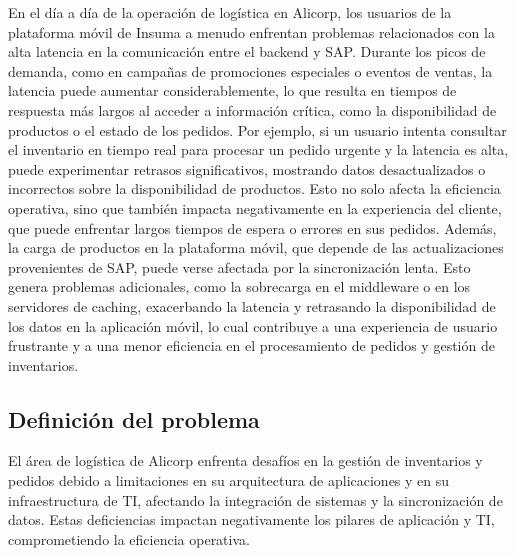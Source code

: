 En el día a día de la operación de logística en Alicorp, los usuarios de la plataforma móvil de Insuma a menudo enfrentan problemas relacionados con la alta latencia en la comunicación entre el backend y SAP. Durante los picos de demanda, como en campañas de promociones especiales o eventos de ventas, la latencia puede aumentar considerablemente, lo que resulta en tiempos de respuesta más largos al acceder a información crítica, como la disponibilidad de productos o el estado de los pedidos. Por ejemplo, si un usuario intenta consultar el inventario en tiempo real para procesar un pedido urgente y la latencia es alta, puede experimentar retrasos significativos, mostrando datos desactualizados o incorrectos sobre la disponibilidad de productos. Esto no solo afecta la eficiencia operativa, sino que también impacta negativamente en la experiencia del cliente, que puede enfrentar largos tiempos de espera o errores en sus pedidos. Además, la carga de productos en la plataforma móvil, que depende de las actualizaciones provenientes de SAP, puede verse afectada por la sincronización lenta. Esto genera problemas adicionales, como la sobrecarga en el middleware o en los servidores de caching, exacerbando la latencia y retrasando la disponibilidad de los datos en la aplicación móvil, lo cual contribuye a una experiencia de usuario frustrante y a una menor eficiencia en el procesamiento de pedidos y gestión de inventarios.

\subsection{Definición del problema}
El área de logística de Alicorp enfrenta desafíos en la gestión de inventarios y pedidos debido a limitaciones en su arquitectura de aplicaciones y en su infraestructura de TI, afectando la integración de sistemas y la sincronización de datos. Estas deficiencias impactan negativamente los pilares de aplicación y TI, comprometiendo la eficiencia operativa.